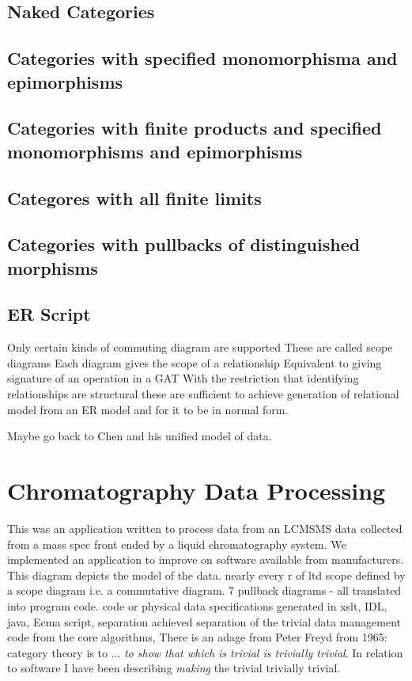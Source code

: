 \documentclass[10pt,a4paper]{article}
\theoremstyle{remark}
\begin{document}
\subsection{Naked Categories}
\subsection{Categories with specified monomorphisma and epimorphisms}
\subsection{Categories with finite products and specified monomorphisms and epimorphisms}
\subsection{Categores with all finite limits}
\subsection{Categories with pullbacks of distinguished morphisms}
\subsection{ER Script}
Only certain kinds of commuting diagram are supported
These are called scope diagrams
Each diagram gives the scope of a relationship
Equivalent to giving signature of an operation in a GAT
With the restriction that identifying relationships are structural these are sufficient to achieve generation of relational model from an ER model and for it to be in normal form.

Maybe go back to Chen and his unified model of data.

\section{Chromatography Data Processing}
\note This was an application written to process data from an LCMSMS data collected from a mass spec front ended by a liquid chromatography system. 
\note We implemented an application to improve on software available from manufacturers. 
\note This diagram depicts the model of the data. 
\note nearly every r of ltd scope defined by a scope diagram i.e. a commutative diagram. 7 pullback diagrams - all translated into program code.
\note code or physical data specifications generated in xslt, IDL, java, Ecma script,
\note separation achieved  separation of the trivial data management code from the core algorithms,
\note There is an adage from Peter Freyd from 1965: category theory is to ... \textit{to show that which is  trivial is trivially trivial}. 
\note In relation to software  I have been describing \textit{making} the trivial trivially trivial. 
\end{document}
